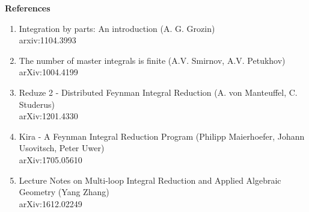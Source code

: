 \documentclass[10pt]{article}
\begin{document}
\textbf{References}

\begin{enumerate}
\item Integration by parts: An introduction 
(A. G. Grozin)\\
arxiv:1104.3993

\item The number of master integrals is finite
(A.V. Smirnov, A.V. Petukhov)\\
arXiv:1004.4199

\item Reduze 2 - Distributed Feynman Integral Reduction
(A. von Manteuffel, C. Studerus)\\
arXiv:1201.4330

\item Kira - A Feynman Integral Reduction Program
(Philipp Maierhoefer, Johann Usovitsch, Peter Uwer) \\
arXiv:1705.05610

\item Lecture Notes on Multi-loop Integral Reduction and Applied Algebraic Geometry
(Yang Zhang)\\
arXiv:1612.02249
\end{enumerate}
\end{document}
